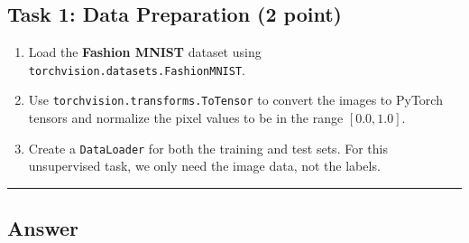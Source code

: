 \documentclass[
  letterpaper,
  DIV=11,
  numbers=noendperiod]{scrartcl}
\providecommand{\tightlist}{%
  \setlength{\itemsep}{0pt}\setlength{\parskip}{0pt}}\usepackage{longtable,booktabs,array}
\begin{document}
\subsection{Task 1: Data Preparation (2
point)}\label{task-1-data-preparation-2-point}

\begin{enumerate}
\def\labelenumi{\arabic{enumi}.}
\tightlist
\item
  Load the \textbf{Fashion MNIST} dataset using
  \texttt{torchvision.datasets.FashionMNIST}.
\item
  Use \texttt{torchvision.transforms.ToTensor} to convert the images to
  PyTorch tensors and normalize the pixel values to be in the range
  \([0.0, 1.0]\).
\item
  Create a \texttt{DataLoader} for both the training and test sets. For
  this unsupervised task, we only need the image data, not the labels.
\end{enumerate}

\begin{center}\rule{0.5\linewidth}{0.5pt}\end{center}

\subsection{Answer}\label{answer-8}
\end{document}
